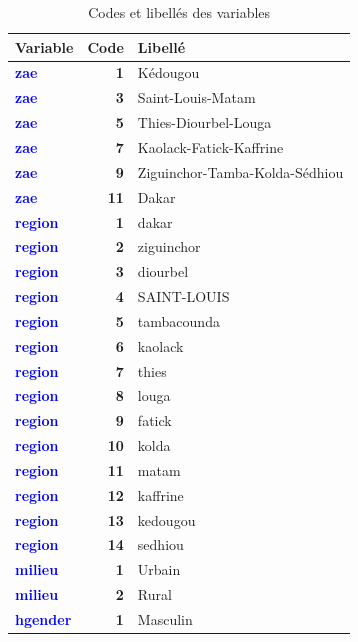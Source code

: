 \documentclass[
]{article}
\begin{document}
\begin{longtable}[t]{>{}l>{}r>{\raggedright\arraybackslash}p{8cm}}
\caption{\label{tab:recodage-harmonisation-3}Codes et libellés des variables}\\
\toprule
Variable & Code & Libellé\\
\midrule
\textcolor{blue}{\textbf{zae}} & \textbf{1} & Kédougou\\
\textcolor{blue}{\textbf{zae}} & \textbf{3} & Saint-Louis-Matam\\
\textcolor{blue}{\textbf{zae}} & \textbf{5} & Thies-Diourbel-Louga\\
\textcolor{blue}{\textbf{zae}} & \textbf{7} & Kaolack-Fatick-Kaffrine\\
\textcolor{blue}{\textbf{zae}} & \textbf{9} & Ziguinchor-Tamba-Kolda-Sédhiou\\
\addlinespace
\textcolor{blue}{\textbf{zae}} & \textbf{11} & Dakar\\
\textcolor{blue}{\textbf{region}} & \textbf{1} & dakar\\
\textcolor{blue}{\textbf{region}} & \textbf{2} & ziguinchor\\
\textcolor{blue}{\textbf{region}} & \textbf{3} & diourbel\\
\textcolor{blue}{\textbf{region}} & \textbf{4} & SAINT-LOUIS\\
\addlinespace
\textcolor{blue}{\textbf{region}} & \textbf{5} & tambacounda\\
\textcolor{blue}{\textbf{region}} & \textbf{6} & kaolack\\
\textcolor{blue}{\textbf{region}} & \textbf{7} & thies\\
\textcolor{blue}{\textbf{region}} & \textbf{8} & louga\\
\textcolor{blue}{\textbf{region}} & \textbf{9} & fatick\\
\addlinespace
\textcolor{blue}{\textbf{region}} & \textbf{10} & kolda\\
\textcolor{blue}{\textbf{region}} & \textbf{11} & matam\\
\textcolor{blue}{\textbf{region}} & \textbf{12} & kaffrine\\
\textcolor{blue}{\textbf{region}} & \textbf{13} & kedougou\\
\textcolor{blue}{\textbf{region}} & \textbf{14} & sedhiou\\
\addlinespace
\textcolor{blue}{\textbf{milieu}} & \textbf{1} & Urbain\\
\textcolor{blue}{\textbf{milieu}} & \textbf{2} & Rural\\
\textcolor{blue}{\textbf{hgender}} & \textbf{1} & Masculin\\

\end{longtable}
\end{document}
